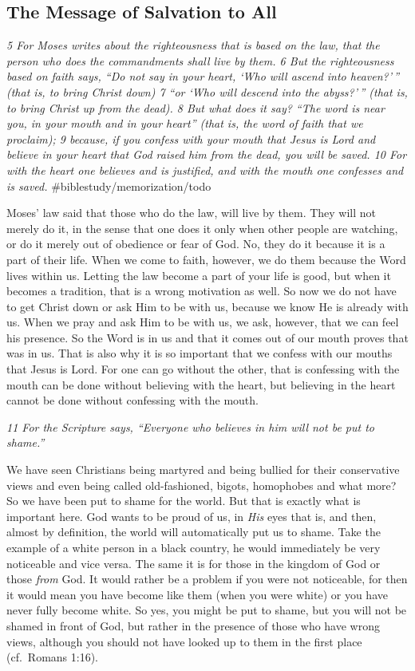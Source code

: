\subsection{The Message of Salvation to All} \emph{5 For Moses writes about
the righteousness that is based on the law, that the person who does the
commandments shall live by them. 6 But the righteousness based on faith
says, ``Do not say in your heart, `Who will ascend into heaven?'\,''
(that is, to bring Christ down) 7 ``or `Who will descend into the
abyss?'\,'' (that is, to bring Christ up from the dead). 8 But what does
it say? ``The word is near you, in your mouth and in your heart'' (that
is, the word of faith that we proclaim); 9 because, if you confess
with your mouth that Jesus is Lord and believe in your heart that God
raised him from the dead, you will be saved. 10 For with the heart one
believes and is justified, and with the mouth one confesses and is
saved.} \#biblestudy/memorization/todo

Moses' law said that those who do the law, will live by them. They will
not merely do it, in the sense that one does it only when other people
are watching, or do it merely out of obedience or fear of God. No, they
do it because it is a part of their life. When we come to faith,
however, we do them because the Word lives within us. Letting the law
become a part of your life is good, but when it becomes a tradition,
that is a wrong motivation as well. So now we do not have to get Christ
down or ask Him to be with us, because we know He is already with us.
When we pray and ask Him to be with us, we ask, however, that we can
feel his presence. So the Word is in us and that it comes out of our
mouth proves that was in us. That is also why it is so important that we
confess with our mouths that Jesus is Lord. For one can go without the
other, that is confessing with the mouth can be done without believing
with the heart, but believing in the heart cannot be done without
confessing with the mouth.

\emph{11 For the Scripture says, ``Everyone who believes in him will not
be put to shame.''}

We have seen Christians being martyred and being bullied for their
conservative views and even being called old-fashioned, bigots,
homophobes and what more? So we have been put to shame for the world.
But that is exactly what is important here. God wants to be proud of us,
in \emph{His} eyes that is, and then, almost by definition, the world
will automatically put us to shame. Take the example of a white person
in a black country, he would immediately be very noticeable and vice
versa. The same it is for those in the kingdom of God or those
\emph{from} God. It would rather be a problem if you were not
noticeable, for then it would mean you have become like them (when you
were white) or you have never fully become white. So yes, you might be
put to shame, but you will not be shamed in front of God, but rather in
the presence of those who have wrong views, although you should not have
looked up to them in the first place (cf.~Romans 1:16).

